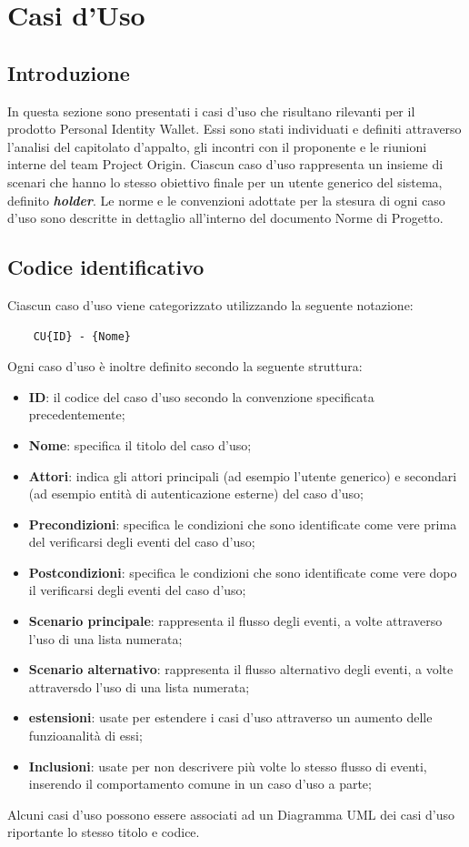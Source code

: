 \section{Casi d'Uso}
\subsection{Introduzione}
In questa sezione sono presentati i casi d'uso che risultano rilevanti per il prodotto Personal Identity Wallet. 
Essi sono stati individuati e definiti attraverso l'analisi del capitolato d'appalto, gli incontri con il proponente e le riunioni interne del team Project Origin.
Ciascun caso d'uso rappresenta un insieme di scenari che hanno lo stesso obiettivo finale per un utente generico del sistema, definito \textbf{\textit{holder}}.
Le norme e le convenzioni adottate per la stesura di ogni caso d'uso sono descritte in dettaglio all'interno del documento Norme di Progetto.
 \subsection{Codice identificativo}
Ciascun caso d'uso viene categorizzato utilizzando la seguente notazione:
\begin{center}\begin{verbatim}
    CU{ID} - {Nome}
\end{verbatim}\end{center}
Ogni caso d’uso è inoltre definito secondo la seguente struttura:
\begin{itemize}
    \item \textbf{ID}: il codice del caso d’uso secondo la convenzione specificata precedentemente;
    \item \textbf{Nome}:  specifica il titolo del caso d’uso;
    \item \textbf{Attori}:  indica gli attori principali (ad esempio l’utente generico) e secondari (ad esempio entità di autenticazione esterne) del caso d’uso;
    \item \textbf{Precondizioni}:  specifica le condizioni che sono identificate come vere prima del verificarsi degli eventi del caso d’uso;
    \item \textbf{Postcondizioni}:  specifica  le  condizioni  che  sono  identificate  come  vere  dopo  il verificarsi degli eventi del caso d’uso;
    \item \textbf{Scenario  principale}:  rappresenta  il  flusso  degli  eventi,  a  volte  attraverso  l'uso di  una  lista  numerata;
    \item \textbf{Scenario alternativo}: rappresenta il flusso alternativo degli eventi, a volte attraversdo l'uso di una lista numerata;
    \item \textbf{estensioni}: usate per estendere i casi d'uso attraverso un aumento delle funzioanalità di essi;
    \item \textbf{Inclusioni}:  usate per non descrivere più volte lo stesso flusso di eventi, inserendo il comportamento comune in un caso d’uso a parte;
\end{itemize}
Alcuni  casi  d’uso  possono  essere  associati  ad  un Diagramma UML  dei  casi  d'uso riportante lo stesso titolo e codice.
